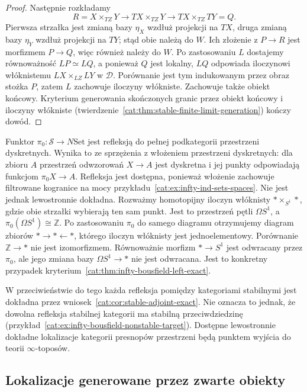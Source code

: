 \begin{proof}
Następnie rozkładamy
\[
 R=X\times_{TZ}Y
 \longrightarrow TX\times_{TZ}Y
 \longrightarrow TX\times_{TZ}TY=Q.
\]
Pierwsza strzałka jest zmianą bazy $\eta_X$ wzdłuż projekcji na $TX$, druga zmianą bazy $\eta_Y$ wzdłuż projekcji na $TY$; stąd obie należą do $W$. Ich złożenie z $P\to R$ jest morfizmem $P\to Q$, więc również należy do $W$. Po zastosowaniu $L$ dostajemy równoważność $LP\simeq LQ$, a ponieważ $Q$ jest lokalny, $LQ$ odpowiada iloczynowi włóknistemu $LX\times_{LZ}LY$ w $\mathcal D$. Porównanie jest tym indukowanym przez obraz stożka $P$, zatem $L$ zachowuje iloczyny włókniste. Zachowuje także obiekt końcowy. Kryterium generowania skończonych granic przez obiekt końcowy i iloczyny włókniste (twierdzenie~\ref{cat:thm:stable-finite-limit-generation}) kończy dowód.
\end{proof}

\begin{przyklad}\label{cat:ex:infty-bousfield-truncation-not-lex}
Funktor $\pi_0:\mathcal S\to N\mathrm{Set}$ jest refleksją do pełnej podkategorii przestrzeni dyskretnych. Wynika to ze sprzężenia z włożeniem przestrzeni dyskretnych: dla zbioru $A$ przestrzeń odwzorowań $X\to A$ jest dyskretna i jej punkty odpowiadają funkcjom $\pi_0X\to A$. Refleksja jest dostępna, ponieważ włożenie zachowuje filtrowane kogranice na mocy przykładu~\ref{cat:ex:infty-ind-sets-spaces}. Nie jest jednak lewostronnie dokładna. Rozważmy homotopijny iloczyn włóknisty $*\times_{S^1}*$, gdzie obie strzałki wybierają ten sam punkt. Jest to przestrzeń pętli $\Omega S^1$, a $\pi_0(\Omega S^1)\cong\mathbb Z$. Po zastosowaniu $\pi_0$ do samego diagramu otrzymujemy diagram zbiorów $*\to *\leftarrow *$, którego iloczyn włóknisty jest jednoelementowy. Porównanie $\mathbb Z\to *$ nie jest izomorfizmem. Równoważnie morfizm $*\to S^1$ jest odwracany przez $\pi_0$, ale jego zmiana bazy $\Omega S^1\to *$ nie jest odwracana. Jest to konkretny przypadek kryterium~\ref{cat:thm:infty-bousfield-left-exact}.
\end{przyklad}

W przeciwieństwie do tego każda refleksja pomiędzy kategoriami stabilnymi jest dokładna przez wniosek~\ref{cat:cor:stable-adjoint-exact}. Nie oznacza to jednak, że dowolna refleksja stabilnej kategorii ma stabilną przeciwdziedzinę (przykład~\ref{cat:ex:infty-bousfield-nonstable-target}). Dostępne lewostronnie dokładne lokalizacje kategorii presnopów przestrzeni będą punktem wyjścia do teorii $\infty$-toposów.

\subsection{Lokalizacje generowane przez zwarte obiekty}

